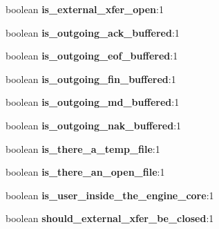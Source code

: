 \begin{DoxyCompactItemize}
\item 
boolean {\bfseries is\+\_\+external\+\_\+xfer\+\_\+open}\+:1\hypertarget{struct_m_a_c_h_i_n_e_a80b275c61b5029c15b2121819bd7d201}{}\label{struct_m_a_c_h_i_n_e_a80b275c61b5029c15b2121819bd7d201}

\item 
boolean {\bfseries is\+\_\+outgoing\+\_\+ack\+\_\+buffered}\+:1\hypertarget{struct_m_a_c_h_i_n_e_aa343af0073ac10714f1a1dcf7c3fcca6}{}\label{struct_m_a_c_h_i_n_e_aa343af0073ac10714f1a1dcf7c3fcca6}

\item 
boolean {\bfseries is\+\_\+outgoing\+\_\+eof\+\_\+buffered}\+:1\hypertarget{struct_m_a_c_h_i_n_e_ab84ebd1e34a22baea85bb6dcab099cda}{}\label{struct_m_a_c_h_i_n_e_ab84ebd1e34a22baea85bb6dcab099cda}

\item 
boolean {\bfseries is\+\_\+outgoing\+\_\+fin\+\_\+buffered}\+:1\hypertarget{struct_m_a_c_h_i_n_e_ad62dd4df8bf3fd1f5aafdf5048ac3b4c}{}\label{struct_m_a_c_h_i_n_e_ad62dd4df8bf3fd1f5aafdf5048ac3b4c}

\item 
boolean {\bfseries is\+\_\+outgoing\+\_\+md\+\_\+buffered}\+:1\hypertarget{struct_m_a_c_h_i_n_e_a5d5f9c0653f11afdb99d7c34b6601b78}{}\label{struct_m_a_c_h_i_n_e_a5d5f9c0653f11afdb99d7c34b6601b78}

\item 
boolean {\bfseries is\+\_\+outgoing\+\_\+nak\+\_\+buffered}\+:1\hypertarget{struct_m_a_c_h_i_n_e_a315e01ff6a08b2cf084fdb6dc9e5f580}{}\label{struct_m_a_c_h_i_n_e_a315e01ff6a08b2cf084fdb6dc9e5f580}

\item 
boolean {\bfseries is\+\_\+there\+\_\+a\+\_\+temp\+\_\+file}\+:1\hypertarget{struct_m_a_c_h_i_n_e_a0a7025547a73c28e38adc39f04ad45f4}{}\label{struct_m_a_c_h_i_n_e_a0a7025547a73c28e38adc39f04ad45f4}

\item 
boolean {\bfseries is\+\_\+there\+\_\+an\+\_\+open\+\_\+file}\+:1\hypertarget{struct_m_a_c_h_i_n_e_a2a65fc5fc2a7f047af17d8b01cd28077}{}\label{struct_m_a_c_h_i_n_e_a2a65fc5fc2a7f047af17d8b01cd28077}

\item 
boolean {\bfseries is\+\_\+user\+\_\+inside\+\_\+the\+\_\+engine\+\_\+core}\+:1\hypertarget{struct_m_a_c_h_i_n_e_a0dee57b83bae5ff84bd25cb53cdeaa03}{}\label{struct_m_a_c_h_i_n_e_a0dee57b83bae5ff84bd25cb53cdeaa03}

\item 
boolean {\bfseries should\+\_\+external\+\_\+xfer\+\_\+be\+\_\+closed}\+:1\hypertarget{struct_m_a_c_h_i_n_e_a76935ecb4670a6b5d85f11437da9de5d}{}\label{struct_m_a_c_h_i_n_e_a76935ecb4670a6b5d85f11437da9de5d}


\end{DoxyCompactItemize}
